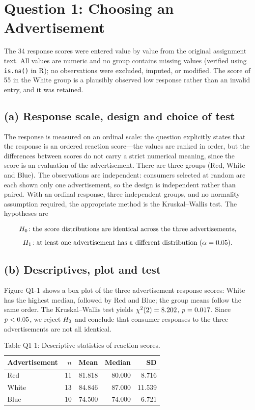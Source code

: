 \section{Question 1: Choosing an Advertisement}

The 34 response scores were entered value by value from the original assignment text. All values are numeric and no group contains missing values (verified using \texttt{is.na()} in R); no observations were excluded, imputed, or modified. The score of 55 in the White group is a plausibly observed low response rather than an invalid entry, and it was retained.

\FloatBarrier
\subsection*{(a) Response scale, design and choice of test}

The response is measured on an ordinal scale: the question explicitly states that the response is an ordered reaction score---the values are ranked in order, but the differences between scores do not carry a strict numerical meaning, since the score is an evaluation of the advertisement. There are three groups (Red, White and Blue). The observations are independent: consumers selected at random are each shown only one advertisement, so the design is independent rather than paired. With an ordinal response, three independent groups, and no normality assumption required, the appropriate method is the Kruskal--Wallis test. The hypotheses are

\[
H_0\colon \text{the score distributions are identical across the three advertisements,}
\]
\[
H_1\colon \text{at least one advertisement has a different distribution } (\alpha = 0.05).
\]

\FloatBarrier
\subsection*{(b) Descriptives, plot and test}

Figure Q1-1 shows a box plot of the three advertisement response scores: White has the highest median, followed by Red and Blue; the group means follow the same order. The Kruskal--Wallis test yields $\chi^2(2) = 8.202$, $\mathit{p} = 0.017$. Since $\mathit{p} < 0.05$, we reject $H_0$ and conclude that consumer responses to the three advertisements are not all identical.

\begin{table}[htbp]
\centering
\caption*{Table Q1-1: Descriptive statistics of reaction scores.}
\begin{tabular}{lrrrr}\toprule
Advertisement & $n$ & Mean & Median & SD \\\midrule
Red & 11 & 81.818 & 80.000 & 8.716 \\
White & 13 & 84.846 & 87.000 & 11.539 \\
Blue & 10 & 74.500 & 74.000 & 6.721 \\\bottomrule
\end{tabular}
\end{table}


